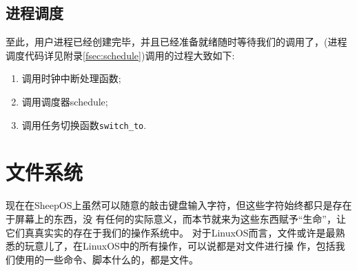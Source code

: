 \subsection{进程调度}
至此，用户进程已经创建完毕，并且已经准备就绪随时等待我们的调用了，(进程调度代码详见附录\ref{fsec:schedule})调用的过程大致如下:
\begin{enumerate}
\item 调用时钟中断处理函数;
\item 调用调度器schedule;
\item 调用任务切换函数\texttt{switch\_to}.
\end{enumerate}

\section{文件系统}
\label{sec:file}

现在在SheepOS上虽然可以随意的敲击键盘输入字符，但这些字符始终都只是存在于屏幕上的东西，没
有任何的实际意义，而本节就来为这些东西赋予“生命”，让它们真真实实的存在于我们的操作系统中。
对于LinuxOS而言，文件或许是最熟悉的玩意儿了，在LinuxOS中的所有操作，可以说都是对文件进行操
作，包括我们使用的一些命令、脚本什么的，都是文件。

